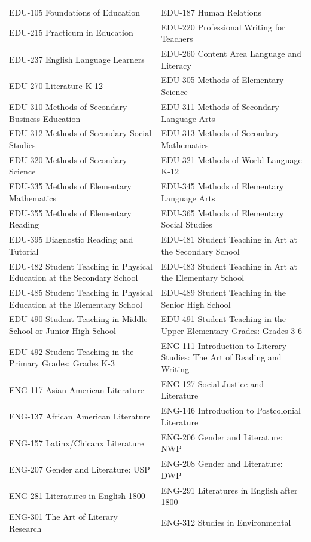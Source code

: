 \documentclass[
  letterpaper,
]{scrbook}
\begin{document}
{\begin{longtable}[]{@{}
  >{\raggedright\arraybackslash}p{}
  >{\raggedright\arraybackslash}p{}@{}}
EDU-105 Foundations of Education & EDU-187 Human Relations \\
EDU-215 Practicum in Education & EDU-220 Professional Writing for
Teachers \\
EDU-237 English Language Learners & EDU-260 Content Area Language and
Literacy \\
EDU-270 Literature K-12 & EDU-305 Methods of Elementary Science \\
EDU-310 Methods of Secondary Business Education & EDU-311 Methods of
Secondary Language Arts \\
EDU-312 Methods of Secondary Social Studies & EDU-313 Methods of
Secondary Mathematics \\
EDU-320 Methods of Secondary Science & EDU-321 Methods of World Language
K-12 \\
EDU-335 Methods of Elementary Mathematics & EDU-345 Methods of
Elementary Language Arts \\
EDU-355 Methods of Elementary Reading & EDU-365 Methods of Elementary
Social Studies \\
EDU-395 Diagnostic Reading and Tutorial & EDU-481 Student Teaching in
Art at the Secondary School \\
EDU-482 Student Teaching in Physical Education at the Secondary School &
EDU-483 Student Teaching in Art at the Elementary School \\
EDU-485 Student Teaching in Physical Education at the Elementary School
& EDU-489 Student Teaching in the Senior High School \\
EDU-490 Student Teaching in Middle School or Junior High School &
EDU-491 Student Teaching in the Upper Elementary Grades: Grades 3-6 \\
EDU-492 Student Teaching in the Primary Grades: Grades K-3 & ENG-111
Introduction to Literary Studies: The Art of Reading and Writing \\
ENG-117 Asian American Literature & ENG-127 Social Justice and
Literature \\
ENG-137 African American Literature & ENG-146 Introduction to
Postcolonial Literature \\
ENG-157 Latinx/Chicanx Literature & ENG-206 Gender and Literature:
NWP \\
ENG-207 Gender and Literature: USP & ENG-208 Gender and Literature:
DWP \\
ENG-281 Literatures in English 1800 & ENG-291 Literatures in English
after 1800 \\
ENG-301 The Art of Literary Research & ENG-312 Studies in Environmental

\end{longtable}}
\end{document}
